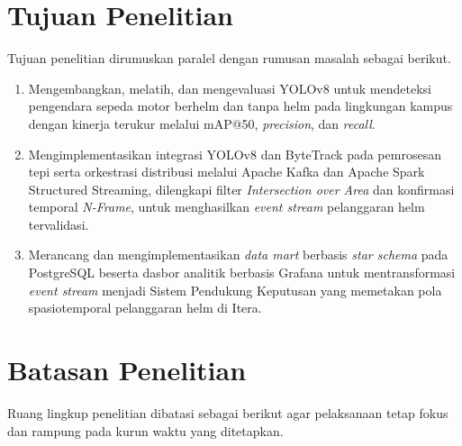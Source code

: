\section{Tujuan Penelitian}
\label{section:tujuanpenelitian}

Tujuan penelitian dirumuskan paralel dengan rumusan masalah sebagai berikut.

\begin{enumerate}
  \item Mengembangkan, melatih, dan mengevaluasi YOLOv8 untuk mendeteksi pengendara sepeda motor berhelm dan tanpa helm pada lingkungan kampus dengan kinerja terukur melalui mAP@50, \textit{precision}, dan \textit{recall}.

  \item Mengimplementasikan integrasi YOLOv8 dan ByteTrack pada pemrosesan tepi serta orkestrasi distribusi melalui Apache Kafka dan Apache Spark Structured Streaming, dilengkapi filter \textit{Intersection over Area} dan konfirmasi temporal \textit{N-Frame}, untuk menghasilkan \textit{event stream} pelanggaran helm tervalidasi.

  \item Merancang dan mengimplementasikan \textit{data mart} berbasis \textit{star schema} pada PostgreSQL beserta dasbor analitik berbasis Grafana untuk mentransformasi \textit{event stream} menjadi Sistem Pendukung Keputusan yang memetakan pola spasiotemporal pelanggaran helm di Itera.
\end{enumerate}

\section{Batasan Penelitian}
\label{section:batasanpenelitian}

Ruang lingkup penelitian dibatasi sebagai berikut agar pelaksanaan tetap fokus dan rampung pada kurun waktu yang ditetapkan.

